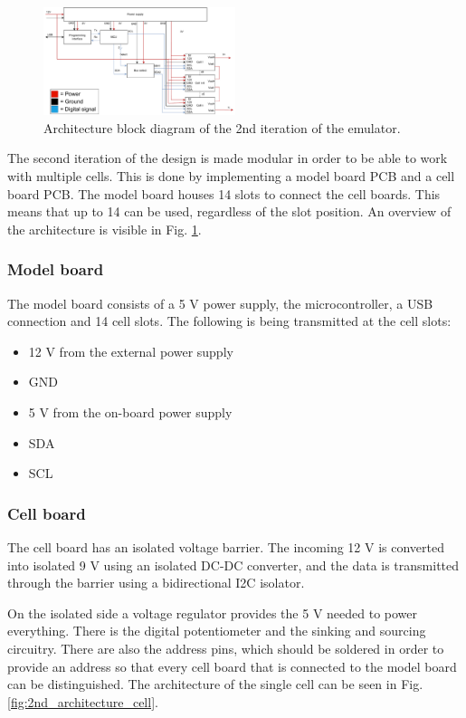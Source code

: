 \begin{figure}[h]
    \centering
    \includegraphics[width=0.5\textwidth]{architecture_2nd_iteration.pdf}
    \caption{Architecture block diagram of the 2nd iteration of the emulator.}
    \label{fig:2nd_architecture}
\end{figure}

The second iteration of the design is made modular in order to be able to work
 with multiple cells. This is done by implementing a model board
PCB and a cell board PCB. The model board houses 14 slots to connect the cell boards.
This means that up to 14 can be used, regardless 
of the slot position. An overview of the architecture is visible in 
Fig. \ref{fig:2nd_architecture}.

    \subsubsection{Model board}
    The model board consists of a 5 V power supply, the microcontroller, a USB 
    connection and 14 cell slots. The following is being transmitted at the
    cell slots:

    \begin{itemize}
        \item 12 V from the external power supply
        \item GND
        \item 5 V from the on-board power supply
        \item SDA
        \item SCL
    \end{itemize}

    \subsubsection{Cell board}
    The cell board has an isolated voltage barrier. The incoming 12 V is 
    converted into isolated 9 V using an isolated DC-DC converter, and the data is
    transmitted through the barrier using a bidirectional I2C isolator.

    On the isolated side a voltage regulator provides 
    the 5 V needed to power everything. There is the digital potentiometer
    and the sinking and sourcing circuitry. There are also the address pins, which
    should be soldered in order to provide an address so that every cell board that 
    is connected to the model board can be distinguished.
    The architecture of the single cell can be seen in Fig. 
    \ref{fig:2nd_architecture_cell}.

